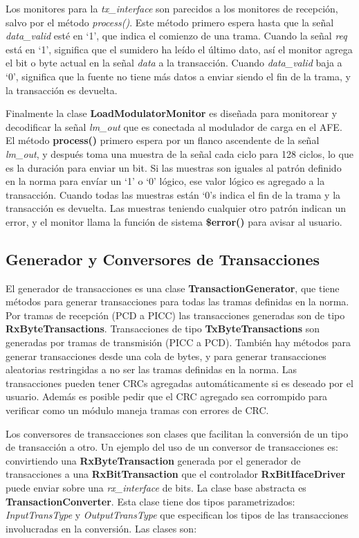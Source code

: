 \documentclass[a4paper, twoside, 11pt]{report}
\begin{document}
Los monitores para la \textit{tx\_interface} son parecidos a los monitores de recepción, salvo por el método \textit{process()}. Este método primero espera hasta que la señal \textit{data\_valid} esté en ‘1’, que indica el comienzo de una trama. Cuando la señal \textit{req} está en ‘1’, significa que el sumidero ha leído el último dato, así el monitor agrega el bit o byte actual en la señal \textit{data} a la transacción. Cuando \textit{data\_valid} baja a ‘0’, significa que la fuente no tiene más datos a enviar siendo el fin de la trama, y la transacción es devuelta.

Finalmente la clase \textbf{LoadModulatorMonitor} es diseñada para monitorear y decodificar la señal \textit{lm\_out} que es conectada al modulador de carga en el AFE. El método \textbf{process()} primero espera por un flanco ascendente de la señal \textit{lm\_out}, y después toma una muestra de la señal cada ciclo para 128 ciclos, lo que es la duración para enviar un bit. Si las muestras son iguales al patrón definido en la norma para envíar un ‘1’ o ‘0’ lógico, ese valor lógico es agregado a la transacción. Cuando todas las muestras están ‘0’s indica el fin de la trama y la transacción es devuelta. Las muestras teniendo cualquier otro patrón indican un error, y el monitor llama la función de sistema \textbf{\$error()} para avisar al usuario.

\FloatBarrier
\subsection{Generador y Conversores de Transacciones}

El generador de transacciones es una clase \textbf{TransactionGenerator}, que tiene métodos para generar transacciones para todas las tramas definidas en la norma. Por tramas de recepción (PCD a PICC) las transacciones generadas son de tipo \textbf{RxByteTransactions}. Transacciones de tipo \textbf{TxByteTransactions} son generadas por tramas de transmisión (PICC a PCD). También hay métodos para generar transacciones desde una cola de bytes, y para generar transacciones aleatorias restringidas a no ser las tramas definidas en la norma. Las transacciones pueden tener CRCs agregadas automáticamente si es deseado por el usuario. Además es posible pedir que el CRC agregado sea corrompido para verificar como un módulo maneja tramas con errores de CRC.

Los conversores de transacciones son clases que facilitan la conversión de un tipo de transacción a otro. Un ejemplo del uso de un conversor de transacciones es: convirtiendo una \textbf{RxByteTransaction} generada por el generador de transacciones a una \textbf{RxBitTransaction} que el controlador \textbf{RxBitIfaceDriver} puede enviar sobre una \textit{rx\_interface} de bits. La clase base abstracta es \textbf{TransactionConverter}. Esta clase tiene dos tipos parametrizados: \textit{InputTransType} y \textit{OutputTransType} que especifican los tipos de las transacciones involucradas en la conversión. Las clases son:
\end{document}
